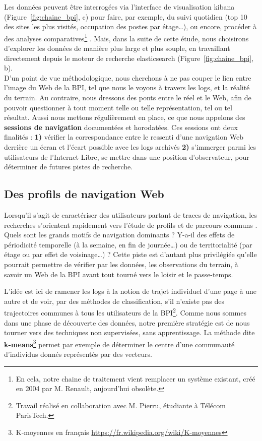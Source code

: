 \documentclass[symmetric,justified,marginals=raggedouter]{tufte-book}
\begin{document}
Les données peuvent être interrogées via l'interface de visualisation kibana (Figure~\ref{fig:chaine_bpi}, c) pour faire, par exemple, du suivi quotidien (top 10 des sites les plus visités, occupation des postes par étage\ldots{}), ou encore, procéder à des analyses comparatives\footnote{\RaggedOuter En cela, notre chaine de traitement vient remplacer un système existant, créé en 2004 par M. Renault, aujourd'hui obsolète.} \citep{amar_analyse_2018}. Mais, dans la suite de cette étude, nous choisirons d'explorer les données de manière plus large et plus souple, en travaillant directement depuis le moteur de recherche elasticsearch (Figure~\ref{fig:chaine_bpi}, b). \\

\noindent D'un point de vue méthodologique, nous cherchons à ne pas couper le lien entre l'image du Web de la BPI, tel que nous le voyons à travers les logs, et la réalité du terrain. Au contraire, nous dressons des ponts entre le réel et le Web, afin de pouvoir questionner à tout moment telle ou telle représentation, tel ou tel résultat. Aussi nous mettons régulièrement en place, ce que nous appelons des \textbf{sessions de navigation} documentées et horodatées. Ces sessions ont deux finalités : \textbf{1)} vérifier la correspondance entre le ressenti d'une navigation Web derrière un écran et l'écart possible avec les logs archivés \textbf{2)} s'immerger parmi les utilisateurs de l'Internet Libre, se mettre dans une position d'observateur, pour déterminer de futures pistes de recherche.

\subsection{Des profils de navigation Web} 

\noindent Lorsqu'il s'agit de caractériser des utilisateurs partant de traces de navigation, les recherches s'orientent rapidement vers l'étude de profils et de parcours communs \citep{feng_web_2006}. Quels sont les grands motifs de navigation dominants ? Y-a-il des effets de périodicité temporelle (à la semaine, en fin de journée\ldots{}) ou de territorialité (par étage ou par effet de voisinage\ldots{}) ? Cette piste est d'autant plus privilégiée qu'elle pourrait permettre de vérifier par les données, les observations du terrain, à savoir un Web de la BPI avant tout tourné vers le loisir et le passe-temps.

L'idée est ici de ramener les logs à la notion de trajet individuel d'une page à une autre et de voir, par des méthodes de classification, s'il n'existe pas des trajectoires communes à tous les utilisateurs de la BPI\footnote{\RaggedOuter Travail réalisé en collaboration avec M. Pierru, étudiante à Télécom ParisTech.}. Comme nous sommes dans une phase de découverte des données, notre première stratégie est de nous tourner vers des techniques non supervisées, sans apprentissage. La méthode dite \textbf{k-means}\footnote{\RaggedOuter K-moyennes en français \url{https://fr.wikipedia.org/wiki/K-moyennes}} permet par exemple de déterminer le centre d'une communauté d'individus donnés représentés par des vecteurs.
\end{document}
